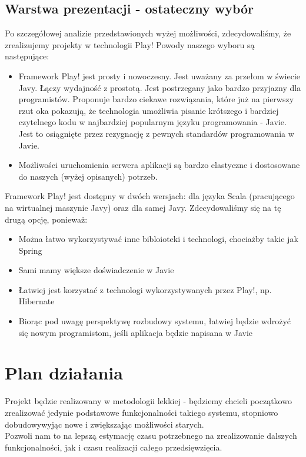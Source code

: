 \documentclass[a4paper,12pt,notitlepage]{mwrep}
\begin{document}
\subsection{Warstwa prezentacji - ostateczny wybór}
Po szczegółowej analizie przedstawionych wyżej możliwości, zdecydowaliśmy,
że zrealizujemy projekty w technologii Play! Powody naszego wyboru są następujące:
\begin{itemize}
	\item	Framework Play! jest prosty i nowoczesny. Jest uważany za przełom w świecie Javy.
			Łączy wydajność z prostotą. Jest postrzegany jako bardzo przyjazny dla programistów.
			Proponuje bardzo ciekawe rozwiązania, które już na pierwszy rzut oka pokazują,
			że technologia umożliwia pisanie krótszego i bardziej czytelnego kodu w najbardziej
			popularnym języku programowania - Javie. Jest to osiągnięte przez rezygnację
			z pewnych standardów programowania w Javie.
	\item	Możliwości uruchomienia serwera aplikacji są bardzo elastyczne i dostosowane
			do naszych (wyżej opisanych) potrzeb. 
\end{itemize}
Framework Play! jest dostępny w dwóch wersjach: dla języka Scala (pracującego na wirtualnej
maszynie Javy) oraz dla samej Javy. Zdecydowaliśmy się na tę drugą opcję, ponieważ:
\begin{itemize}
	\item	Można łatwo wykorzystywać inne bibloioteki i technologi, chociażby takie jak Spring
	\item	Sami mamy większe doświadczenie w Javie
	\item	Łatwiej jest korzystać z technologi wykorzystywanych przez Play!, np. Hibernate
	\item	Biorąc pod uwagę perspektywę rozbudowy systemu, łatwiej będzie wdrożyć się nowym programistom,
			jeśli aplikacja będzie napisana w Javie
\end{itemize}


\section{Plan działania}
Projekt będzie realizowany w metodologii lekkiej - będziemy chcieli początkowo
zrealizować jedynie podstawowe funkcjonalności takiego systemu, stopniowo dobudowywyjąc
nowe i zwiększając możliwości starych.\\
Pozwoli nam to na lepszą estymację czasu potrzebnego na zrealizowanie dalszych funkcjonalności,
jak i czasu realizacji całego przedsięwzięcia.
\end{document}
